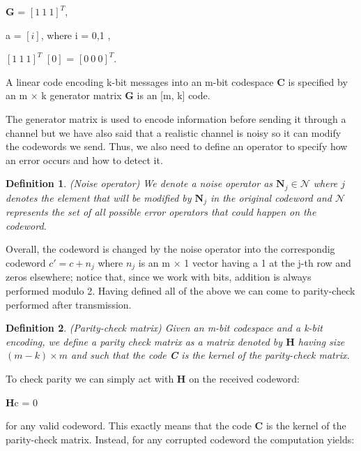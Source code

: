 \documentclass{Configuration_Files/PoliMi3i_thesis}
\newtheorem{definition}{Definition}[chapter]
\begin{document}
\begin{center}
	\textbf{G} = $[1 \ 1 \ 1]^{T}$,  
\end{center}
\begin{center}
	a = $[i]$, where i = 0,1 ,
\end{center}
\begin{center}
	$[1 \ 1 \ 1]^{T}$ $[0]$ = $[0 \ 0 \ 0]^{T}$.
\end{center}

A linear code encoding k-bit messages into an m-bit codespace \textbf{C} is specified by an m $\times$ k generator matrix {\bf G} is an [m, k] code.\newline

The { generator matrix} is used to encode information before sending it through a channel but we have also said that a realistic channel is noisy so it can modify the codewords we send. Thus, we also need to define an operator to specify how an error occurs and how to detect it. 

\begin{definition}(Noise operator)
	We denote a noise operator as $\textbf{N}_j \in \mathcal{N}$ where $j$ denotes the element that will be modified by $\textbf{N}_j$ in the original codeword and $\mathcal{N}$  represents the set of all possible error operators that could happen on the codeword. 
\end{definition} 

Overall, the codeword is changed by the noise operator into the correspondig codeword $c' =c + {n}_j$ where ${n}_j$ is an m $\times$ 1 vector having a 1 at the j-th row and zeros elsewhere; notice that, since we work with bits, addition is always performed modulo 2.\newline
Having defined all of the above we can come to parity-check performed after transmission.

\begin{definition}(Parity-check matrix)
	Given an m-bit codespace and a k-bit encoding, we define a parity check matrix as a matrix denoted by $\textbf{H}$ having size $(m - k)\times m $ and such that the code {\bf C} is the kernel of the parity-check matrix. 
\end{definition}

To check parity we can simply act with {\bf H} on the received codeword: 

\begin{center}
	\textbf{H}c = 0  
\end{center}

for any valid codeword. This exactly means that the code {\bf C} is the kernel of the parity-check matrix.\newline
Instead, for any corrupted codeword the computation yields:
\end{document}
